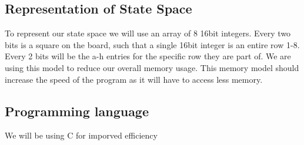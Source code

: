\documentclass[12pt]{article}
\begin{document}
\subsection*{Representation of State Space}
To represent our state space we will use an array of 8 16bit integers.
Every two bits is a square on the board, such that a single 16bit integer is an entire row 1-8.
Every 2 bits will be the a-h entries for the specific row they are part of.
We are using this model to reduce our overall memory usage.
This memory model should increase the speed of the program as it will have to access less memory.

\subsection*{Programming language}
We will be using C for imporved efficiency
\end{document}
